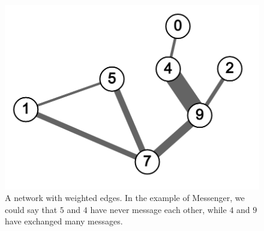 \begin{figure}[H]
  \centering
  \includegraphics[scale=.25]{img/weighted_sample.png}
  \caption{A network with weighted edges. In the example of Messenger,
          we could say that $5$ and $4$ have never message each other,
          while $4$ and $9$ have exchanged many messages.}
  \label{fig:net_weight}
\end{figure}